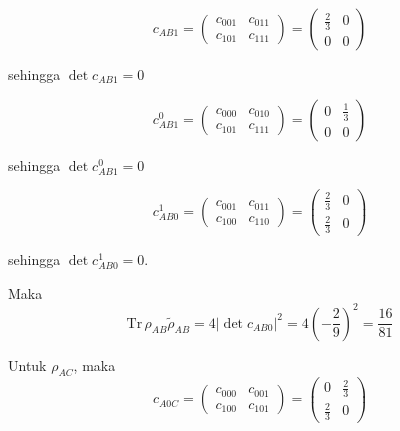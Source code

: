 \begin{equation}
	c_{AB1}=
	\begin{pmatrix}
		c_{001} & c_{011} \\
		c_{101} & c_{111}
	\end{pmatrix}=
	\begin{pmatrix}
		\frac{2}{3} & 0 \\
		0 & 0
	\end{pmatrix}
\end{equation}

sehingga $\det c_{AB1} = 0$

\begin{equation}
	c_{AB1}^0=
	\begin{pmatrix}
		c_{000} & c_{010} \\
		c_{101} & c_{111}
	\end{pmatrix}=
	\begin{pmatrix}
		0 & \frac{1}{3} \\
		0 & 0
	\end{pmatrix}
\end{equation}

sehingga $\det c_{AB1}^0 = 0$

\begin{equation}
	c_{AB0}^1=
	\begin{pmatrix}
		c_{001} & c_{011} \\
		c_{100} & c_{110}
	\end{pmatrix}=
	\begin{pmatrix}
		\frac{2}{3} & 0 \\
		\frac{2}{3} & 0
	\end{pmatrix}
\end{equation}

sehingga $\det c_{AB0}^1 = 0$.

Maka
\begin{equation}
	\mathrm{Tr}\,\rho_{AB}\tilde{\rho}_{AB}=4|\det c_{AB0}|^2=4(-\frac{2}{9})^2=\frac{16}{81}
\end{equation}

Untuk $\rho_{AC}$, maka
\begin{equation}
	c_{A0C}=
	\begin{pmatrix}
		c_{000} & c_{001} \\
		c_{100} & c_{101}
	\end{pmatrix}=
	\begin{pmatrix}
		0 & \frac{2}{3} \\
		\frac{2}{3} & 0
	\end{pmatrix}
\end{equation}

